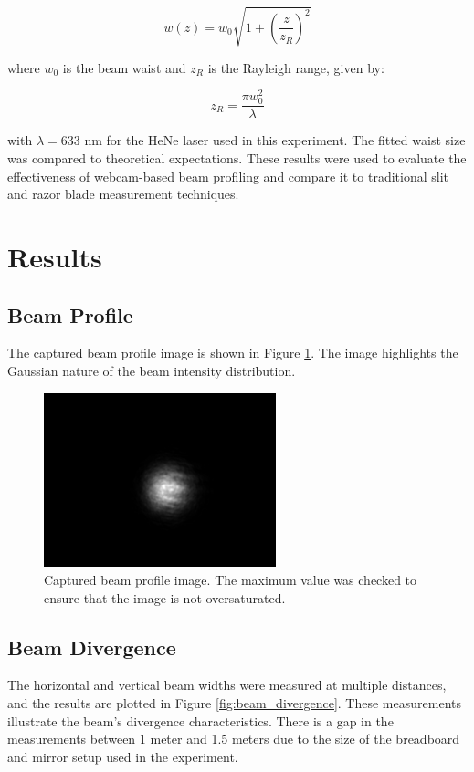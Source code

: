 \documentclass[12pt]{article}
\begin{document}
\begin{equation}
    w(z) = w_0 \sqrt{1 + \left( \frac{z}{z_R} \right)^2 }
\end{equation}

where \( w_0 \) is the beam waist and \( z_R \) is the Rayleigh range, given by:

\begin{equation}
    z_R = \frac{\pi w_0^2}{\lambda}
\end{equation}

with \( \lambda = 633 \) nm for the HeNe laser used in this experiment. The fitted waist size was compared to theoretical expectations. These results were used to evaluate the effectiveness of webcam-based beam profiling and compare it to traditional slit and razor blade measurement techniques.

\section{Results}
\subsection{Beam Profile}
The captured beam profile image is shown in Figure \ref{fig:beam_profile}. The image highlights the Gaussian nature of the beam intensity distribution.

\begin{figure} [H]
    \centering
    \includegraphics[width=0.6\textwidth]{Lab Modern Optics Image.png}
    \caption{Captured beam profile image. The maximum value was checked to ensure that the image is not oversaturated.}
    \label{fig:beam_profile}
\end{figure}

\subsection{Beam Divergence}
The horizontal and vertical beam widths were measured at multiple distances, and the results are plotted in Figure \ref{fig:beam_divergence}. These measurements illustrate the beam’s divergence characteristics. There is a gap in the measurements between 1 meter and 1.5 meters due to the size of the breadboard and mirror setup used in the experiment.
\end{document}
